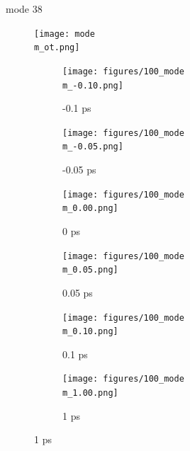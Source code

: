 \documentclass{beamer}
\newcommand\w{0.32}
\begin{document}
\renewcommand\m{38}
\begin{frame}{mode \m}
	\vspace{\vh mm}
	\begin{figure}
		\centering
		\texttt{[image: mode\\m\_ot.png]}
	\end{figure}
	\begin{figure}
		\centering
		\begin{subfigure}[b]{\w\textwidth}
			\centering
			\texttt{[image: figures/100\_mode\\m\_-0.10.png]}
			\caption{-0.1 ps}
		\end{subfigure}
		\begin{subfigure}[b]{\w\textwidth}
			\centering
			\texttt{[image: figures/100\_mode\\m\_-0.05.png]}
			\caption{-0.05 ps}
		\end{subfigure}
		\begin{subfigure}[b]{\w\textwidth}
			\centering
			\texttt{[image: figures/100\_mode\\m\_0.00.png]}
			\caption{0 ps}
		\end{subfigure}
		\begin{subfigure}[b]{\w\textwidth}
			\centering
			\texttt{[image: figures/100\_mode\\m\_0.05.png]}
			\caption{0.05 ps}
		\end{subfigure}
		\begin{subfigure}[b]{\w\textwidth}
			\centering
			\texttt{[image: figures/100\_mode\\m\_0.10.png]}
			\caption{0.1 ps}
		\end{subfigure}
		\begin{subfigure}[b]{\w\textwidth}
			\centering
			\texttt{[image: figures/100\_mode\\m\_1.00.png]}
			\caption{1 ps}
		\end{subfigure}
	\end{figure}
\end{frame}
\end{document}
